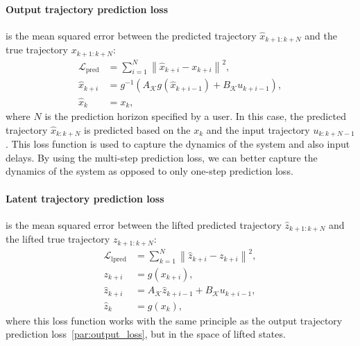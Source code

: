 \documentclass[conference]{IEEEtran}
\begin{document}
\paragraph*{Output trajectory prediction loss}\label{par:output_loss}
is the mean squared error between the predicted trajectory \(\hat{x}_{k+1:k+N}\) and the true trajectory \(x_{k+1:k+N}\):
\begin{subequations}
    \begin{align}
        \mathcal{L}_{\text{pred}} & = \sum_{i=1}^{N}\left\|\hat{x}_{k+i} - x_{k+i}\right\|^2,                      \\
        \hat{x}_{k+i}             & = g^{-1}\left(A_\mathcal{K}g(\hat{x}_{k+i-1}) + B_\mathcal{K}u_{k+i-1}\right), \\
        \hat{x}_{k}               & = x_{k},
    \end{align}
\end{subequations}
where \(N\) is the prediction horizon specified by a user. In this case, the predicted trajectory \(\hat{x}_{k:k+N}\) is predicted based on the \(x_k\) and the input trajectory \(u_{k:k+N-1}\). This loss function is used to capture the dynamics of the system and also input delays. By using the multi-step prediction loss, we can better capture the dynamics of the system as opposed to only one-step prediction loss.

\paragraph*{Latent trajectory prediction loss}
is the mean squared error between the lifted predicted trajectory \(\hat{z}_{k+1:k+N}\) and the lifted true trajectory \(z_{k+1:k+N}\):
\begin{subequations}
    \begin{align}
        \mathcal{L}_{\text{lpred}} & = \sum_{k=1}^{N}\left\|\hat{z}_{k+i} - z_{k+i}\right\|^2,  \\
        z_{k+i}                    & = g(x_{k+i}),                                              \\
        \hat{z}_{k+i}              & = A_{\mathcal{K}}\hat{z}_{k+i-1}+B_{\mathcal{K}}u_{k+i-1}, \\
        \hat{z}_{k}                & = g(x_{k}),
    \end{align}
\end{subequations}
where this loss function works with the same principle as the output trajectory prediction loss~\ref{par:output_loss}, but in the space of lifted states.
\end{document}
